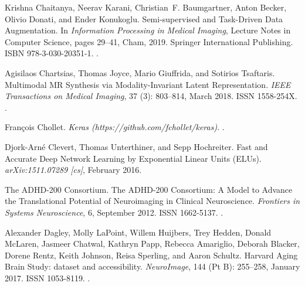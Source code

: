 \documentclass{midl}
\begin{document}
\begin{thebibliography}{50}
Krishna Chaitanya, Neerav Karani, Christian~F. Baumgartner, Anton Becker,
  Olivio Donati, and Ender Konukoglu.
\newblock Semi-supervised and {Task}-{Driven} {Data} {Augmentation}.
\newblock In \emph{Information {Processing} in {Medical} {Imaging}}, Lecture
  {Notes} in {Computer} {Science}, pages 29--41, Cham, 2019. Springer
  International Publishing.
\newblock ISBN 978-3-030-20351-1.
\newblock {}.

Agisilaos Chartsias, Thomas Joyce, Mario Giuffrida, and Sotirios Tsaftaris.
\newblock Multimodal {MR} {Synthesis} via {Modality}-{Invariant} {Latent}
  {Representation}.
\newblock \emph{IEEE Transactions on Medical Imaging}, 37
  (3): 803--814, March 2018.
\newblock ISSN 1558-254X.
\newblock {}.

François Chollet.
\newblock \emph{Keras (https://github.com/fchollet/keras)}.
.

Djork-Arné Clevert, Thomas Unterthiner, and Sepp Hochreiter.
\newblock Fast and {Accurate} {Deep} {Network} {Learning} by {Exponential}
  {Linear} {Units} ({ELUs}).
\newblock \emph{arXiv:1511.07289 [cs]}, February 2016.

The ADHD-200 Consortium.
\newblock The {ADHD}-200 {Consortium}: {A} {Model} to {Advance} the
  {Translational} {Potential} of {Neuroimaging} in {Clinical} {Neuroscience}.
\newblock \emph{Frontiers in Systems Neuroscience}, 6, September 2012.
\newblock ISSN 1662-5137.
\newblock {}.

Alexander Dagley, Molly LaPoint, Willem Huijbers, Trey Hedden, Donald McLaren,
  Jasmeer Chatwal, Kathryn Papp, Rebecca Amariglio, Deborah Blacker, Dorene
  Rentz, Keith Johnson, Reisa Sperling, and Aaron Schultz.
\newblock Harvard {Aging} {Brain} {Study}: dataset and accessibility.
\newblock \emph{NeuroImage}, 144 (Pt B): 255--258, January
  2017.
\newblock ISSN 1053-8119.
\newblock {}.


\end{thebibliography}
\end{document}
